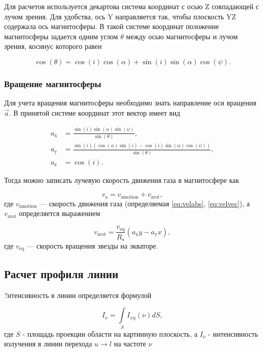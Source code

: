 \documentclass{article}
\begin{document}
Для расчетов используется декартова система координат с осью Z совпадающей с лучом зрения. Для удобства, ось Y направляется так, чтобы плоскость YZ содержала ось магнитосферы. В такой системе координат положение магнитосферы задается одним углом $\theta$ между осью магнитосферы и лучом зрения, косинус которого равен

\begin{equation} \label{eq:costet}
\cos(\theta) = \cos(i)\cos(\alpha) + \sin(i)\sin(\alpha)\cos(\psi).
\end{equation}

\subsubsection{Вращение магнитосферы}

Для учета вращения магнитосферы необходимо знать направление оси вращения $\vec{a}$. В принятой системе координат этот вектор имеет вид

\begin{align} \label{eq:rotaxis}
a_\text{x} & = \frac{\sin(i)\sin(\alpha)\sin(\psi)}{\sin(\theta)}, \nonumber \\ 
a_\text{y} & = \frac{\sin(i)(\cos(\alpha)\sin(i) - \cos(i)\sin(\alpha)\cos(\psi))}{\sin(\theta)}, \nonumber \\ 
a_\text{z} & = \cos(i).
\end{align}

Тогда можно записать лучевую скорость движения газа в магнитосфере как

\begin{equation} \label{eq:vz}
v_\text{z} = v_\text{zmotion} + v_\text{zrot}, 
\end{equation}
где $v_\text{zmotion}$ --- скорость движения газа (определяемая \eqref{eq:velabs}, \eqref{eq:velvec}), а $v_\text{zrot}$ определяется выражением

\begin{equation} \label{eq:vzrot}
v_\text{zrot} = \frac{v_\text{eq}}{R_\star}(a_\text{x}y - a_\text{y}x),
\end{equation}
где $v_\text{eq}$ --- скорость вращения звезды на экваторе.

\subsection{Расчет профиля линии}


?нтенсивность в линии определяется формулой

\begin{equation} \label{eq:profmain}
I_{\nu} = \int \limits_{S} I_{xy}(\nu) dS,
\end{equation}
где $S$ - площадь проекции области на картинную плоскость, а $I_\nu$ - интенсивность излучения в линии перехода $u \rightarrow l$ на частоте $\nu$ 
\end{document}
